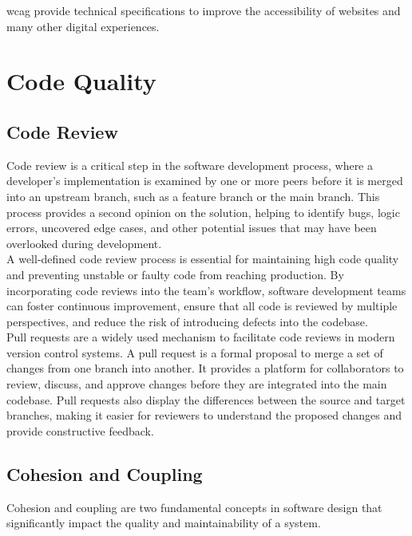 \gls{wcag} provide technical specifications to improve the accessibility of websites and many other digital experiences. \cite{levelaccess:wcag}

\section{Code Quality}
\label{sec:code-quality}

\subsection{Code Review}
\label{subsec:code-review}

Code review is a critical step in the software development process, where a developer's implementation is examined by one or more peers before it is merged into an upstream branch, such as a feature branch or the main branch. This process provides a second opinion on the solution, helping to identify bugs, logic errors, uncovered edge cases, and other potential issues that may have been overlooked during development. \cite{gitlab:code-review} \\

A well-defined code review process is essential for maintaining high code quality and preventing unstable or faulty code from reaching production. By incorporating code reviews into the team's workflow, software development teams can foster continuous improvement, ensure that all code is reviewed by multiple perspectives, and reduce the risk of introducing defects into the codebase. \cite{gitlab:code-review} \\

Pull requests are a widely used mechanism to facilitate code reviews in modern version control systems. A pull request is a formal proposal to merge a set of changes from one branch into another. It provides a platform for collaborators to review, discuss, and approve changes before they are integrated into the main codebase. Pull requests also display the differences between the source and target branches, making it easier for reviewers to understand the proposed changes and provide constructive feedback. \cite{github:pr}

\subsection{Cohesion and Coupling}
\label{subsec:cohesion-and-coupling}

Cohesion and coupling are two fundamental concepts in software design that significantly impact the quality and maintainability of a system. \\

